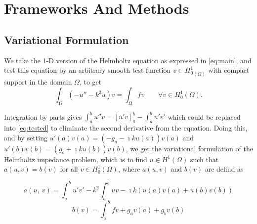 \section{Frameworks And Methods}\label{sec:frameworks}

\subsection{Variational Formulation}
\label{sec:variational}

We take the 1-D version of the Helmholtz equation as expressed in \autoref{eq:main}, and test this equation by an arbitrary smooth test function $v \in {H_{0}^{1} }_{(\Omega)}$ with compact support in the domain $\Omega$, to get
\begin{equation}
    \label{eq:tested}
    \int_{\Omega}{{(-u'' - k^2u)}v} = \int_{\Omega}{fv} \qquad \forall v \in {H_{0}^{1}(\Omega)}.
\end{equation}

Integration by parts gives $\int_{a}^{b}{u''v} = [u'v]_{a}^{b} - \int_{a}^{b}{u'v'}$ which could be replaced into \autoref{eq:tested} to eliminate the second derivative from the equation. Doing this, and by setting $u'(a)v(a) = (-g_a-\imath ku(a))v(a)$ and $u'(b)v(b) = (g_b+\imath ku(b))v(b)$, we get the variational formulation of the Helmholtz impedance problem, which is to find $u \in {H^{1}(\Omega)}$ such that $a(u,v) = b(v)$ for all $v \in {H_{0}^{1}(\Omega)}$, where $a(u,v)$ and $b(v)$ are defind as

\begin{equation}
    \label{eq:varlhs}
    a(u,\:v) = \int_{a}^{b}{u'v'} - k^2 \int_{a}^{b}{uv} - \imath k (u(a)v(a) + u(b)v(b))
\end{equation}
\begin{equation}
    \label{eq:varrhs}
    b(v) = \int_{a}^{b}{fv} + g_a v(a) + g_b v(b)
\end{equation}


